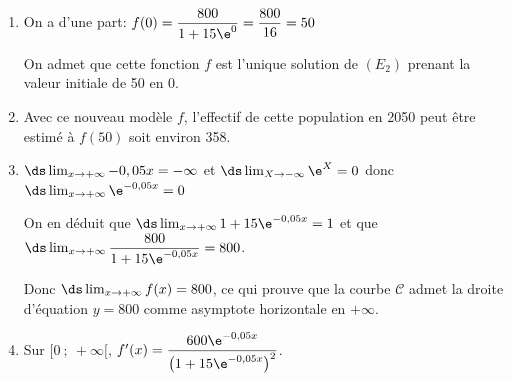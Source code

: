 	\begin{enumerate}
		\item %
On a d'une part:		$f(0)=\dfrac{800}{1+15 \e^{0}} = \dfrac{800}{16}=50$
		

On admet que cette fonction $f$ est l'unique solution de $(E_{2})$ prenant la valeur initiale de 50 en 0.

		\item Avec ce nouveau modèle $f$,  l'effectif de cette population en 2050 peut être estimé à $f(50)$ soit environ 358.
		

		\item %
$\ds\lim_{x\to +\infty} -0,05x = -\infty$ et
$\ds\lim_{X\to -\infty} \e^{X}=0$ donc 
$\ds\lim_{x\to +\infty} \e^{-0,05x} = 0$

On en déduit  que 
$\ds\lim_{x\to +\infty} 1+15\e^{-0,05x} = 1$ et que
$\ds\lim_{x\to +\infty} \dfrac{800}{1+15\e^{-0,05x}} = 800$.

Donc $\ds\lim_{x\to +\infty} f(x)=800$, ce qui prouve que la courbe $\mathcal{C}$ admet la droite d'équation $y=800$ comme asymptote horizontale en $+\infty$.
		
		\item %
Sur $[0 ~;~+\infty[$,  $f'(x)=\dfrac{600 \e^{-0,05 x}}{\left(1+15 \e^{-0,05 x}\right)^{2}}$.


\end{enumerate}
